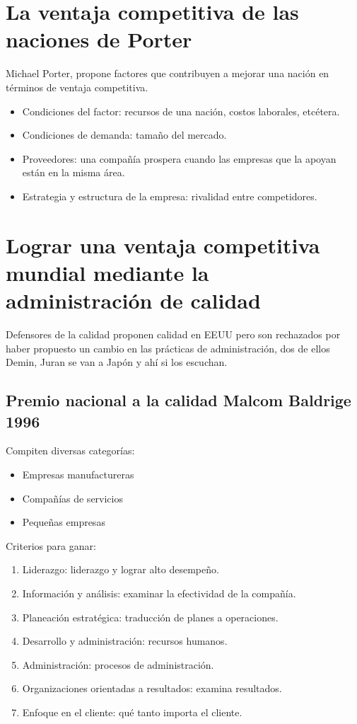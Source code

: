 \documentclass{article}
\begin{document}

\section{La ventaja competitiva de las naciones de Porter}
Michael Porter, propone factores que contribuyen a mejorar una nación en términos de ventaja competitiva.
\begin{itemize}
    \item Condiciones del factor: recursos de una nación, costos laborales, etcétera.
    \item Condiciones de demanda: tamaño del mercado.
    \item Proveedores: una compañía prospera cuando las empresas que la apoyan están en la misma área.
    \item Estrategia y estructura de la empresa: rivalidad entre competidores.
\end{itemize}


\section{Lograr una ventaja competitiva mundial mediante la administración de calidad}
Defensores de la calidad proponen calidad en EEUU pero son rechazados por haber propuesto un cambio en las prácticas de administración, dos de ellos Demin, Juran se van a Japón y ahí si los escuchan.

\subsection{Premio nacional a la calidad Malcom Baldrige 1996}
Compiten diversas categorías:
\begin{itemize}
    \item Empresas manufactureras 
    \item Compañías de servicios 
    \item Pequeñas empresas 
\end{itemize}
Criterios para ganar:
\begin{enumerate}
    \item Liderazgo: liderazgo y lograr alto desempeño.
    \item Información y análisis: examinar la efectividad de la compañía.
    \item Planeación estratégica: traducción de planes a operaciones.
    \item Desarrollo y administración: recursos humanos.
    \item Administración: procesos de administración.
    \item Organizaciones orientadas a resultados: examina resultados.
    \item Enfoque en el cliente: qué tanto importa el cliente. 
\end{enumerate}
\end{document}

